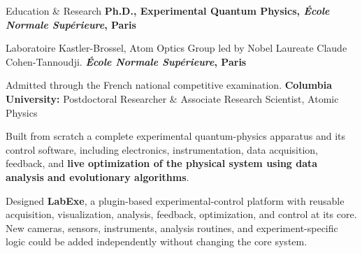 \begin{rubric}{Education \& Research}
\entry*[2008]%
\textbf{Ph.D., Experimental Quantum Physics, \textit{\'Ecole Normale Sup\'erieure}, Paris}
\par{Laboratoire Kastler-Brossel, Atom Optics Group led by Nobel Laureate Claude Cohen-Tannoudji.}
\entry*[2001]%
\textbf{\textit{\'Ecole Normale Sup\'erieure}, Paris}
\par{Admitted through the French national competitive examination.}
\entry*[2008--2013]%
\textbf{Columbia University:} Postdoctoral Researcher \& Associate Research Scientist, Atomic Physics
\par{Built from scratch a complete experimental quantum-physics apparatus and its control software,
including electronics, instrumentation, data acquisition, feedback, and \textbf{live optimization of the
physical system using data analysis and evolutionary algorithms}.}
\par{Designed \textbf{LabExe}, a plugin-based experimental-control platform with reusable acquisition,
visualization, analysis, feedback, optimization, and control at its core. New cameras, sensors,
instruments, analysis routines, and experiment-specific logic could be added independently without
changing the core system.}
\end{rubric}
